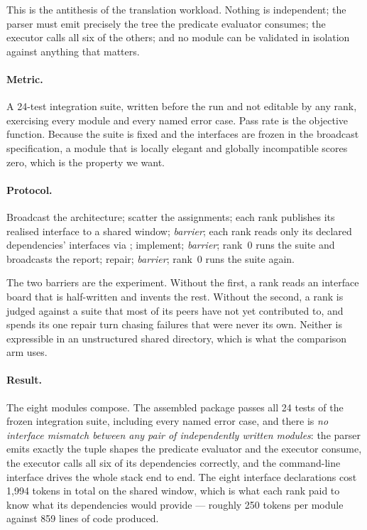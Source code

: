 This is the antithesis of the translation workload. Nothing is independent;
the parser must emit precisely the tree the predicate evaluator consumes;
the executor calls all six of the others; and no module can be validated in
isolation against anything that matters.

\paragraph{Metric.} A 24-test integration suite, written before the run and
not editable by any rank, exercising every module and every named error
case. Pass rate is the objective function. Because the suite is fixed and
the interfaces are frozen in the broadcast specification, a module that is
locally elegant and globally incompatible scores zero, which is the property
we want.

\paragraph{Protocol.} Broadcast the architecture; scatter the assignments;
each rank publishes its realised interface to a shared window; \emph{barrier};
each rank reads only its declared dependencies' interfaces via
; implement; \emph{barrier}; rank~0 runs the suite and
broadcasts the report; repair; \emph{barrier}; rank~0 runs the suite again.

The two barriers are the experiment. Without the first, a rank reads an
interface board that is half-written and invents the rest. Without the
second, a rank is judged against a suite that most of its peers have not yet
contributed to, and spends its one repair turn chasing failures that were
never its own. Neither is expressible in an unstructured shared directory,
which is what the comparison arm uses.



\paragraph{Result.} The eight modules compose. The assembled package passes
all 24 tests of the frozen integration suite, including every named error
case, and there is \emph{no interface mismatch between any pair of
independently written modules}: the parser emits exactly the tuple shapes
the predicate evaluator and the executor consume, the executor calls all six
of its dependencies correctly, and the command-line interface drives the
whole stack end to end. The eight interface declarations cost 1{,}994 tokens
in total on the shared window, which is what each rank paid to know what its
dependencies would provide --- roughly 250 tokens per module against 859
lines of code produced.

